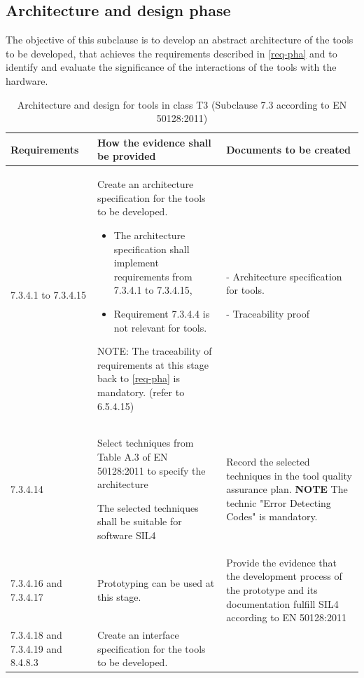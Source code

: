 \documentclass{template/openetcs_report}
\begin{document}
\subsection{Architecture and design phase}
\label{arc-pha}
\begin{flushleft}
The objective of this subclause is to develop an abstract architecture of the tools to be developed, that achieves the requirements described in \ref{req-pha} and to identify and evaluate the significance of the interactions of the tools with the hardware.
 \end{flushleft} 
{\footnotesize\sffamily\centering
\begin{longtable}{|p{2cm}|p{9cm}|p{3cm}|}
\caption{Architecture and design for tools in class T3 (Subclause 7.3 according to EN 50128:2011)}\\
\hline
\bfseries Requirements & \bfseries How the evidence shall be provided & \bfseries Documents to be created\\
\hline
\hline
\endhead
\hline
\endfoot

7.3.4.1 to 7.3.4.15 & Create an architecture specification for the tools to be developed.
\begin{itemize}\itemsep=0pt
  \item The architecture specification shall implement requirements from 7.3.4.1 to 7.3.4.15,
  \item Requirement 7.3.4.4 is not relevant for tools. 
\end{itemize}
NOTE: \linebreak
The traceability of requirements at this stage back to \ref{req-pha} is mandatory. (refer to 6.5.4.15)
& - Architecture specification for tools.

- Traceability proof\\
\hline
7.3.4.14 & Select techniques from Table A.3 of EN 50128:2011 to specify the architecture 

The selected techniques shall be suitable for software SIL4
& Record the selected techniques in the tool quality assurance plan.
\linebreak
\linebreak
\textbf{NOTE}\linebreak
The technic "Error Detecting Codes" is mandatory.\\ 
\hline
7.3.4.16 and 7.3.4.17 & Prototyping can be used at this stage.
& Provide the evidence that the development process of the prototype and its documentation fulfill SIL4 according to EN 50128:2011\\ 
\hline
7.3.4.18 and 7.3.4.19 and 8.4.8.3 & Create an interface specification for the tools to be developed.


\end{longtable}}
\end{document}
